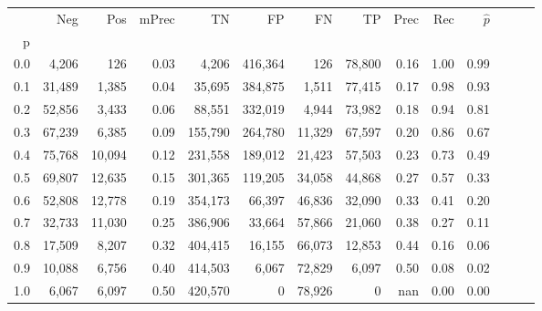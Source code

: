 \begin{tabular}{rrrrrrrrrrrrrr}
\toprule
{} &     Neg &     Pos & mPrec &       TN &       FP &      FN &      TP &  Prec &   Rec & $\hat{p}$ \\
p   &         &         &       &          &          &         &         &       &       &           \\
\midrule
0.0 &   4,206 &     126 &  0.03 &    4,206 &  416,364 &     126 &  78,800 &  0.16 &  1.00 &      0.99 \\
0.1 &  31,489 &   1,385 &  0.04 &   35,695 &  384,875 &   1,511 &  77,415 &  0.17 &  0.98 &      0.93 \\
0.2 &  52,856 &   3,433 &  0.06 &   88,551 &  332,019 &   4,944 &  73,982 &  0.18 &  0.94 &      0.81 \\
0.3 &  67,239 &   6,385 &  0.09 &  155,790 &  264,780 &  11,329 &  67,597 &  0.20 &  0.86 &      0.67 \\
0.4 &  75,768 &  10,094 &  0.12 &  231,558 &  189,012 &  21,423 &  57,503 &  0.23 &  0.73 &      0.49 \\
0.5 &  69,807 &  12,635 &  0.15 &  301,365 &  119,205 &  34,058 &  44,868 &  0.27 &  0.57 &      0.33 \\
0.6 &  52,808 &  12,778 &  0.19 &  354,173 &   66,397 &  46,836 &  32,090 &  0.33 &  0.41 &      0.20 \\
0.7 &  32,733 &  11,030 &  0.25 &  386,906 &   33,664 &  57,866 &  21,060 &  0.38 &  0.27 &      0.11 \\
0.8 &  17,509 &   8,207 &  0.32 &  404,415 &   16,155 &  66,073 &  12,853 &  0.44 &  0.16 &      0.06 \\
0.9 &  10,088 &   6,756 &  0.40 &  414,503 &    6,067 &  72,829 &   6,097 &  0.50 &  0.08 &      0.02 \\
1.0 &   6,067 &   6,097 &  0.50 &  420,570 &        0 &  78,926 &       0 &   nan &  0.00 &      0.00 \\
\bottomrule
\end{tabular}
